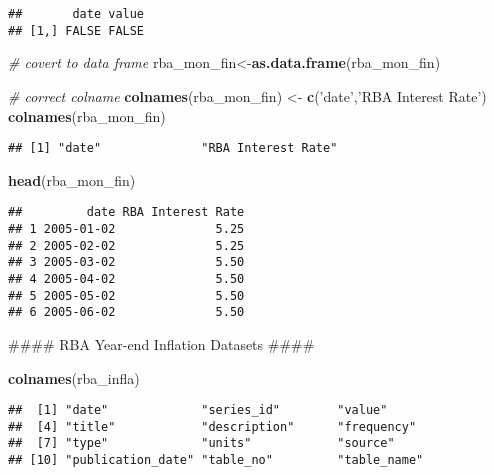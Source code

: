 \documentclass[]{article}
\newenvironment{Shaded}{\begin{snugshade}}{\end{snugshade}}
\newcommand{\KeywordTok}[1]{\textcolor[rgb]{0.13,0.29,0.53}{\textbf{#1}}}
\newcommand{\StringTok}[1]{\textcolor[rgb]{0.31,0.60,0.02}{#1}}
\newcommand{\CommentTok}[1]{\textcolor[rgb]{0.56,0.35,0.01}{\textit{#1}}}
\newcommand{\NormalTok}[1]{#1}
\begin{document}
\begin{verbatim}
##       date value
## [1,] FALSE FALSE
\end{verbatim}

\begin{Shaded}
\begin{Highlighting}[]
    \CommentTok{# covert to data frame}
\NormalTok{    rba_mon_fin<-}\KeywordTok{as.data.frame}\NormalTok{(rba_mon_fin)}
    
    \CommentTok{# correct colname}
    \KeywordTok{colnames}\NormalTok{(rba_mon_fin) <-}\StringTok{ }\KeywordTok{c}\NormalTok{(}\StringTok{'date'}\NormalTok{,}\StringTok{'RBA Interest Rate'}\NormalTok{)}
    \KeywordTok{colnames}\NormalTok{(rba_mon_fin)}
\end{Highlighting}
\end{Shaded}

\begin{verbatim}
## [1] "date"              "RBA Interest Rate"
\end{verbatim}

\begin{Shaded}
\begin{Highlighting}[]
    \KeywordTok{head}\NormalTok{(rba_mon_fin)}
\end{Highlighting}
\end{Shaded}

\begin{verbatim}
##         date RBA Interest Rate
## 1 2005-01-02              5.25
## 2 2005-02-02              5.25
## 3 2005-03-02              5.50
## 4 2005-04-02              5.50
## 5 2005-05-02              5.50
## 6 2005-06-02              5.50
\end{verbatim}

\begin{Shaded}
\begin{Highlighting}[]
\NormalTok{    #### RBA Year-end Inflation Datasets ####}
    
      \KeywordTok{colnames}\NormalTok{(rba_infla)}
\end{Highlighting}
\end{Shaded}

\begin{verbatim}
##  [1] "date"             "series_id"        "value"           
##  [4] "title"            "description"      "frequency"       
##  [7] "type"             "units"            "source"          
## [10] "publication_date" "table_no"         "table_name"
\end{verbatim}
\end{document}
